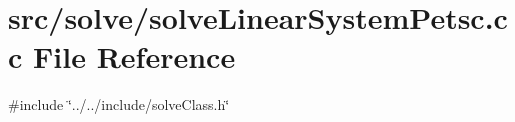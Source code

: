 \section{src/solve/solve\+Linear\+System\+Petsc.cc File Reference}
\label{solve_linear_system_petsc_8cc}
{\ttfamily \#include \char`\"{}../../include/solve\+Class.\+h\char`\"{}}\newline
